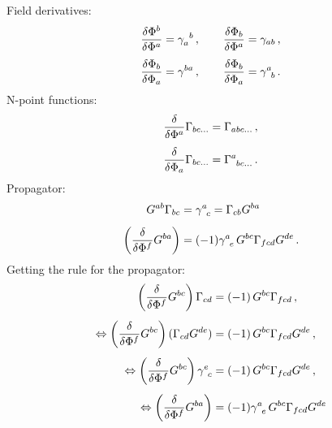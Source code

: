 \documentclass[10pt,prd,nofootinbib,superscriptaddress,twocolumn]{revtex4-2}
\begin{document}
Field derivatives:
%
\begin{align}
	\frac{\delta \Phi^b}{\delta \Phi^a} &= \gamma_a^{\phantom{a}b}
	\,,\qquad
	\frac{\delta \Phi_b}{\delta \Phi^a} = \gamma_{ab}
	\,,\notag\\[1ex]
	\frac{\delta \Phi_b}{\delta \Phi_a} &= \gamma^{ba}
	\,,\qquad
	\frac{\delta \Phi_b}{\delta \Phi_a} = \gamma^{a}_{\phantom{a}b}
	\,.
\end{align}
%
N-point functions:
%
\begin{align}
	\frac{\delta }{\delta \Phi^a} \Gamma_{bc\ldots} = \Gamma_{abc\ldots}
	\,,\notag\\[1ex]
	\frac{\delta }{\delta \Phi_a} \Gamma_{bc\ldots} = \Gamma^{a}_{\phantom{a}bc\ldots}
	\,.
\end{align}
%
Propagator:
%
\begin{align}
	G^{ab}\Gamma_{bc} &= \gamma^{a}_{\phantom{a}c} =	\Gamma_{cb}G^{ba}
	\,\notag\\[1ex]
	\left(\frac{\delta}{\delta \Phi^f}G^{ba}\right) &= (-1)\gamma^a_{\phantom{a}e}\, G^{bc}\Gamma_{fcd}G^{de}
	\,.
\end{align}
%
Getting the rule for the propagator:
%
\begin{align}
	\left(\frac{\delta}{\delta \Phi^f}G^{bc}\right)\Gamma_{cd} &= (-1)\,G^{bc}\Gamma_{fcd}
	\,,\notag\\[1ex]
	\Leftrightarrow\left(\frac{\delta}{\delta \Phi^f}G^{bc}\right)(\Gamma_{cd}G^{de}) &= (-1)\,G^{bc}\Gamma_{fcd}G^{de}
	\,,\notag\\[1ex]
	\Leftrightarrow\left(\frac{\delta}{\delta \Phi^f}G^{bc}\right)\gamma^e_{\phantom{e}c} &= (-1)\,G^{bc}\Gamma_{fcd}G^{de}
	\,,\notag\\[1ex]
	\Leftrightarrow\left(\frac{\delta}{\delta \Phi^f}G^{ba}\right) &= (-1)\gamma^a_{\phantom{a}e}\, G^{bc}\Gamma_{fcd}G^{de}
\end{align}
\end{document}
